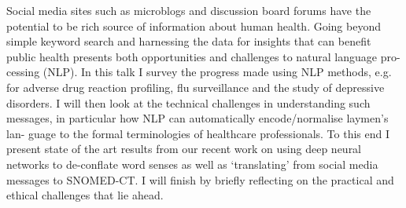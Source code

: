 Social media sites such as microblogs and discussion board forums have the potential to be rich source of information about human health. Going beyond simple keyword search and harnessing the data for insights that can benefit public health presents both opportunities and challenges to natural language pro- cessing (NLP). In this talk I survey the progress made using NLP methods, e.g. for adverse drug reaction profiling, flu surveillance and the study of depressive disorders. I will then look at the technical challenges in understanding such messages, in particular how NLP can automatically encode/normalise laymen's lan- guage to the formal terminologies of healthcare professionals. To this end I present state of the art results from our recent work on using deep neural networks to de-conflate word senses as well as ‘translating' from social media messages to SNOMED-CT. I will finish by briefly reflecting on the practical and ethical challenges that lie ahead.
